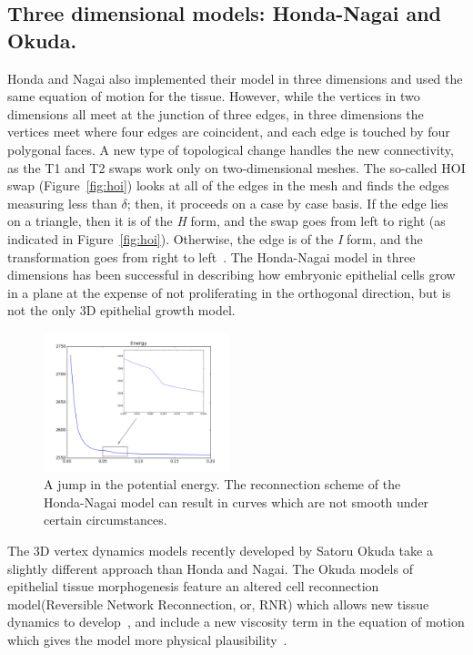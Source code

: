 \subsection{Three dimensional models: Honda-Nagai and Okuda.}
Honda and Nagai also implemented their model in three dimensions and used the same equation of motion for the tissue. However, while the vertices in two dimensions all meet at the junction of three edges,  in three dimensions the vertices meet where four edges are coincident, and each edge is touched by four polygonal faces. A new type of topological change handles the new connectivity, as the T1 and T2 swaps work only on two-dimensional meshes. The so-called HOI swap (Figure~\ref{fig:hoi}) looks at all of the edges in the mesh and finds the edges measuring less than $\delta$; then, it proceeds on a case by case basis. If the edge lies on a triangle, then it is of the \emph{H} form, and the swap goes from left to right (as indicated in Figure~\ref{fig:hoi}). Otherwise, the edge is of the \emph{I} form, and the transformation goes from right to left~\cite{Honda3D}. The Honda-Nagai model in three dimensions has been successful in describing how embryonic epithelial cells grow in a plane at the expense of not proliferating in the orthogonal direction, but is not the only 3D epithelial growth model.
\begin{figure}
  \begin{center}
    \includegraphics[width=0.48\textwidth]{../diagrams/jump.png}
  \end{center}
\caption{A jump in the potential energy. The reconnection scheme of the Honda-Nagai model can 
result in curves which are not smooth under certain circumstances.}
\label{fig:jump}
\end{figure}
The 3D vertex dynamics models recently developed by Satoru Okuda take a slightly different approach than Honda and Nagai. The Okuda models of epithelial tissue morphogenesis feature an altered cell reconnection model(Reversible Network Reconnection, or, RNR) which allows new tissue dynamics to develop~\cite{Okuda1}, and include a new viscosity term in the equation of motion which gives the model more physical plausibility~\cite{Okuda3}.

